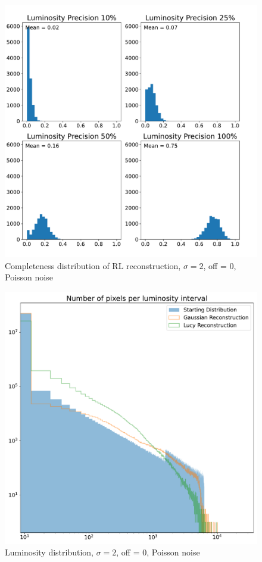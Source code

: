 \documentclass[a4paper]{article}
\begin{document}
		\begin{figure}[h!]
			\centering
			\includegraphics[height=0.4\textheight]{poissgauss2_hists_lucy.pdf}
			\caption{Completeness distribution of RL reconstruction, $\sigma = 2$, off = 0, Poisson noise}
			\label{fig:phl}
		\end{figure}
		\newpage
		\null
		\vfill
		\begin{figure}[h]
			\centering
			\includegraphics[height=0.4\textheight]{poissgauss2_lumin.pdf}
			\caption{Luminosity distribution, $\sigma = 2$, off = 0, Poisson noise}
			\label{fig:pl}
		\end{figure}
		\vfill
	
\end{document}
